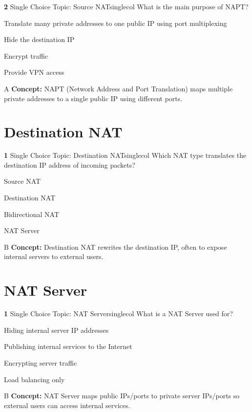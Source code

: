 \documentclass[10pt,a4paper]{article}
\begin{document}
\begin{qcard}{\color{white}\textbf{2} \hfill \small Single Choice \textbar{} Topic: Source NAT}{singlecol}
What is the main purpose of NAPT?

\begin{qoptions}
\item Translate many private addresses to one public IP using port multiplexing
\item Hide the destination IP
\item Encrypt traffic
\item Provide VPN access
\end{qoptions}
\begin{explainbox}{A}
\textbf{Concept:} NAPT (Network Address and Port Translation) maps multiple private addresses to a single public IP using different ports.
\end{explainbox}
\end{qcard}

\section{Destination NAT}
\begin{qcard}{\color{white}\textbf{1} \hfill \small Single Choice \textbar{} Topic: Destination NAT}{singlecol}
Which NAT type translates the destination IP address of incoming packets?

\begin{qoptions}
\item Source NAT
\item Destination NAT
\item Bidirectional NAT
\item NAT Server
\end{qoptions}
\begin{explainbox}{B}
\textbf{Concept:} Destination NAT rewrites the destination IP, often to expose internal servers to external users.
\end{explainbox}
\end{qcard}

\section{NAT Server}
\begin{qcard}{\color{white}\textbf{1} \hfill \small Single Choice \textbar{} Topic: NAT Server}{singlecol}
What is a NAT Server used for?

\begin{qoptions}
\item Hiding internal server IP addresses
\item Publishing internal services to the Internet
\item Encrypting server traffic
\item Load balancing only
\end{qoptions}
\begin{explainbox}{B}
\textbf{Concept:} NAT Server maps public IPs/ports to private server IPs/ports so external users can access internal services.
\end{explainbox}
\end{qcard}
\end{document}

